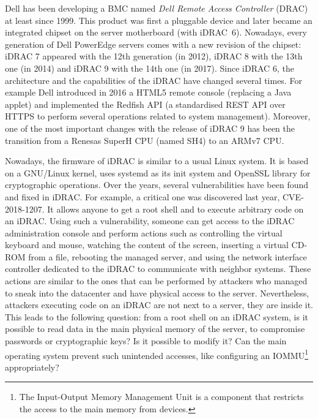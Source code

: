 Dell has been developing a BMC named \emph{Dell Remote Access Controller} (DRAC) at least since 1999.
This product was first a pluggable device and later became an integrated chipset on the server motherboard (with iDRAC~6).
Nowadays, every generation of Dell PowerEdge servers comes with a new revision of the chipset: iDRAC 7 appeared with the 12th generation (in 2012), iDRAC 8 with the 13th one (in 2014) and iDRAC 9 with the 14th one (in 2017).
Since iDRAC 6, the architecture and the capabilities of the iDRAC have changed several times.
For example Dell introduced in 2016 a HTML5 remote console (replacing a Java applet) and implemented the Redfish API (a standardised REST API over HTTPS to perform several operations related to system management).
Moreover, one of the most important changes with the release of iDRAC 9 has been the transition from a Renesas SuperH CPU (named SH4) to an ARMv7 CPU.

Nowadays, the firmware of iDRAC is similar to a usual Linux system.
It is based on a GNU/Linux kernel, uses systemd as its init system and OpenSSL library for cryptographic operations.
Over the years, several vulnerabilities have been found and fixed in iDRAC.
For example, a critical one was discovered last year, CVE-2018-1207.
It allows anyone to get a root shell and to execute arbitrary code on an iDRAC.
Using such a vulnerability, someone can get access to the iDRAC administration console and perform actions such as controlling the virtual keyboard and mouse, watching the content of the screen, inserting a virtual CD-ROM from a file, rebooting the managed server, and using the network interface controller dedicated to the iDRAC to communicate with neighbor systems.
These actions are similar to the ones that can be performed by attackers who managed to sneak into the datacenter and have physical access to the server.
Nevertheless, attackers executing code on an iDRAC are not next to a server, they are inside it.
This leads to the following question: from a root shell on an iDRAC system, is it possible to read data in the main physical memory of the server, to compromise passwords or cryptographic keys?
Is it possible to modify it?
Can the main operating system prevent such unintended accesses, like configuring an IOMMU\footnote{The Input-Output Memory Management Unit is a component that restricts the access to the main memory from devices.} appropriately?

